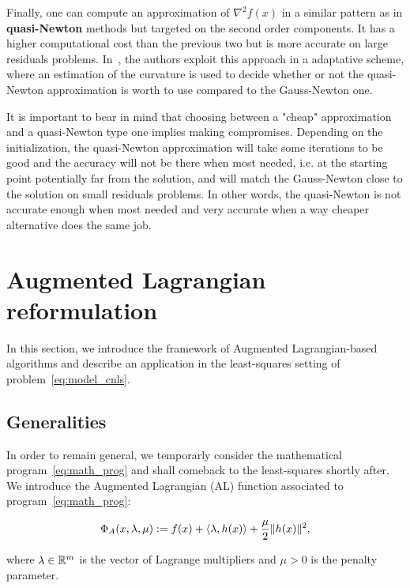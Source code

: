 \documentclass[10pt]{article}
\numberwithin{equation}{section}
\begin{document}
	 Finally, one can compute an approximation of $\nabla^2f(x)$ in a similar pattern as in \textbf{quasi-Newton} methods \cite[][Chapter 6]{nocedalwright:2006} but targeted on the second order components. It has a higher computational cost than the previous two but is more accurate on large residuals problems. In~\cite{dennisetal:1981}, the authors exploit this approach in a adaptative scheme, where an estimation of the curvature is used to decide whether or not the quasi-Newton approximation is worth to use compared to the Gauss-Newton one.
	 
	 It is important to bear in mind that choosing between a "cheap" approximation and a quasi-Newton type one implies making compromises. Depending on the initialization, the quasi-Newton approximation will take some iterations to be good and the accuracy will not be there when most needed, i.e. at the starting point potentially far from the solution, and will match the Gauss-Newton close to the solution on small residuals problems. In other words, the quasi-Newton is not accurate enough when most needed and very accurate when a way cheaper alternative does the same job.
	 
	 
	 
	 \section{Augmented Lagrangian reformulation}
	 
	 In this section, we introduce the framework of Augmented Lagrangian-based algorithms and describe an application in the least-squares setting of problem~\eqref{eq:model_cnls}.
	 
	 \subsection{Generalities}
	 
	 In order to remain general, we temporarly consider the mathematical program~\eqref{eq:math_prog} and shall comeback to the least-squares shortly after. 
	 We introduce the Augmented Lagrangian (AL) function associated to program~\eqref{eq:math_prog}:
	 
	 \begin{equation}
	 	\label{eq:al}
	 	\Phi_A(x,\lambda,\mu) := f(x) + \left\langle {\lambda} , {h(x)} \right\rangle + \dfrac{\mu}{2} \|h(x)\|^2,
	 \end{equation}
	 
	 where $\lambda\in {\mathbb{R}}^m$ is the vector of Lagrange multipliers and $\mu > 0$ is the penalty parameter.
	 
\end{document}
